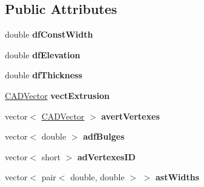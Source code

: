 \subsection*{Public Attributes}
\begin{DoxyCompactItemize}
\item 
double {\bfseries df\+Const\+Width}\hypertarget{class_c_a_d_l_w_polyline_object_a72ea94f5fb155eca94eb1a11ff8c3884}{}\label{class_c_a_d_l_w_polyline_object_a72ea94f5fb155eca94eb1a11ff8c3884}

\item 
double {\bfseries df\+Elevation}\hypertarget{class_c_a_d_l_w_polyline_object_a454ad8049c619d10a9b7ad6751e2ce98}{}\label{class_c_a_d_l_w_polyline_object_a454ad8049c619d10a9b7ad6751e2ce98}

\item 
double {\bfseries df\+Thickness}\hypertarget{class_c_a_d_l_w_polyline_object_a4bf7962c24f0d87dbd8b18d1625f1d49}{}\label{class_c_a_d_l_w_polyline_object_a4bf7962c24f0d87dbd8b18d1625f1d49}

\item 
\hyperlink{class_c_a_d_vector}{C\+A\+D\+Vector} {\bfseries vect\+Extrusion}\hypertarget{class_c_a_d_l_w_polyline_object_ad3eb54192045128229508655fbc13c5f}{}\label{class_c_a_d_l_w_polyline_object_ad3eb54192045128229508655fbc13c5f}

\item 
vector$<$ \hyperlink{class_c_a_d_vector}{C\+A\+D\+Vector} $>$ {\bfseries avert\+Vertexes}\hypertarget{class_c_a_d_l_w_polyline_object_a15372d1fb367f523a543a1924eddb01b}{}\label{class_c_a_d_l_w_polyline_object_a15372d1fb367f523a543a1924eddb01b}

\item 
vector$<$ double $>$ {\bfseries adf\+Bulges}\hypertarget{class_c_a_d_l_w_polyline_object_a64797a790804ef43a725d1dc22e7c347}{}\label{class_c_a_d_l_w_polyline_object_a64797a790804ef43a725d1dc22e7c347}

\item 
vector$<$ short $>$ {\bfseries ad\+Vertexes\+ID}\hypertarget{class_c_a_d_l_w_polyline_object_a1b880471d19186c74f8b7384de574aef}{}\label{class_c_a_d_l_w_polyline_object_a1b880471d19186c74f8b7384de574aef}

\item 
vector$<$ pair$<$ double, double $>$ $>$ {\bfseries ast\+Widths}\hypertarget{class_c_a_d_l_w_polyline_object_a0e1d0b7776c4fd058982148392cc100c}{}\label{class_c_a_d_l_w_polyline_object_a0e1d0b7776c4fd058982148392cc100c}

\end{DoxyCompactItemize}
